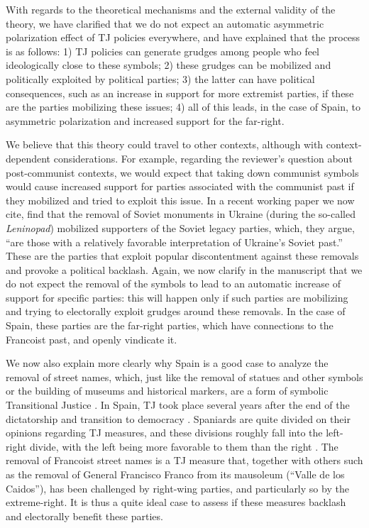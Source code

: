 \documentclass[12pt, a4paper, notitlepage]{article}
\begin{document}
With regards to the theoretical mechanisms and the external validity of the theory, we have clarified that we do not expect an automatic asymmetric polarization effect of TJ policies everywhere, and have explained that the process is as follows: 1) TJ policies can generate grudges among people who feel ideologically close to these symbols; 2) these grudges can be mobilized and politically exploited by political parties; 3) the latter can have political consequences, such as an increase in support for more extremist parties, if these are the parties mobilizing these issues; 4) all of this leads, in the case of Spain, to asymmetric polarization and increased support for the far-right.

We believe that this theory could travel to other contexts, although with context-dependent considerations. For example, regarding the reviewer's question about post-communist contexts, we would expect that taking down communist symbols would cause increased support for parties associated with the communist past if they mobilized and tried to exploit this issue. In a recent working paper we now cite, \citet{Rozenas:2021} find that the removal of Soviet monuments in Ukraine (during the so-called \textit{Leninopad}) mobilized supporters of the Soviet legacy parties, which, they argue, ``are those with a relatively favorable interpretation of Ukraine’s Soviet past.'' These are the parties that exploit popular discontentment against these removals and provoke a political backlash. Again, we now clarify in the manuscript that we do not expect the removal of the symbols to lead to an automatic increase of support for specific parties: this will happen only if such parties are mobilizing and trying to electorally exploit grudges around these removals. In the case of Spain, these parties are the far-right parties, which have connections to the Francoist past, and openly vindicate it.

We now also explain more clearly why Spain is a good case to analyze the removal of street names, which, just like the removal of statues and other symbols or the building of museums and historical markers, are a form of symbolic Transitional Justice \citep{Ward2021, Balcells:2020aa}. In Spain, TJ took place several years after the end of the dictatorship and transition to democracy \citep{Aguilar:2002aa}. Spaniards are quite divided on their opinions regarding TJ measures, and these divisions roughly fall into the left-right divide, with the left being more favorable to them than the right \citep{Aguilar:2011aa}. The removal of Francoist street names is a TJ measure that, together with others such as the removal of General Francisco Franco from its mausoleum (``Valle de los Caidos''), has been challenged by right-wing parties, and particularly so by the extreme-right. It is thus a quite ideal case to assess if these measures backlash and electorally benefit these parties.
\end{document}
